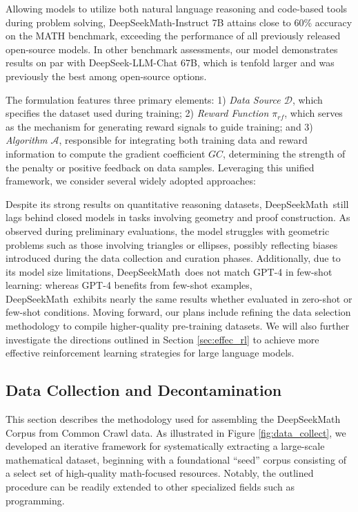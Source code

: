 Allowing models to utilize both natural language reasoning and code-based tools during problem solving, DeepSeekMath-Instruct 7B attains close to 60\% accuracy on the MATH benchmark, exceeding the performance of all previously released open-source models. In other benchmark assessments, our model demonstrates results on par with DeepSeek-LLM-Chat 67B, which is tenfold larger and was previously the best among open-source options.

The formulation features three primary elements: 1) \textit{Data Source $\mathcal{D}$}, which specifies the dataset used during training; 2) \textit{Reward Function $\pi_{{rf}}$}, which serves as the mechanism for generating reward signals to guide training; and 3) \textit{Algorithm $\mathcal{A}$}, responsible for integrating both training data and reward information to compute the gradient coefficient $GC$, determining the strength of the penalty or positive feedback on data samples. Leveraging this unified framework, we consider several widely adopted approaches:

Despite its strong results on quantitative reasoning datasets, DeepSeekMath~still lags behind closed models in tasks involving geometry and proof construction. As observed during preliminary evaluations, the model struggles with geometric problems such as those involving triangles or ellipses, possibly reflecting biases introduced during the data collection and curation phases. Additionally, due to its model size limitations, DeepSeekMath~does not match GPT-4 in few-shot learning: whereas GPT-4 benefits from few-shot examples, DeepSeekMath~exhibits nearly the same results whether evaluated in zero-shot or few-shot conditions. Moving forward, our plans include refining the data selection methodology to compile higher-quality pre-training datasets. We will also further investigate the directions outlined in Section \ref{sec:effec_rl} to achieve more effective reinforcement learning strategies for large language models.

\subsection{Data Collection and Decontamination}
This section describes the methodology used for assembling the DeepSeekMath Corpus from Common Crawl data. As illustrated in Figure \ref{fig:data_collect}, we developed an iterative framework for systematically extracting a large-scale mathematical dataset, beginning with a foundational “seed” corpus consisting of a select set of high-quality math-focused resources. Notably, the outlined procedure can be readily extended to other specialized fields such as programming.


